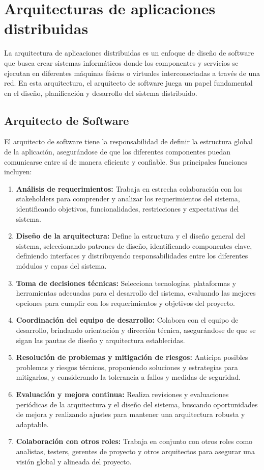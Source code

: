 \chapter{Arquitecturas de aplicaciones distribuidas}

La arquitectura de aplicaciones distribuidas es un enfoque de diseño de software que busca crear sistemas informáticos donde los componentes y servicios se ejecutan en diferentes máquinas físicas o virtuales interconectadas a través de una red. En esta arquitectura, el arquitecto de software juega un papel fundamental en el diseño, planificación y desarrollo del sistema distribuido.

\section{Arquitecto de Software}
El arquitecto de software tiene la responsabilidad de definir la estructura global de la aplicación, asegurándose de que los diferentes componentes puedan comunicarse entre sí de manera eficiente y confiable. Sus principales funciones incluyen:

\begin{enumerate}
	\item \textbf{Análisis de requerimientos:} Trabaja en estrecha colaboración con los stakeholders para comprender y analizar los requerimientos del sistema, identificando objetivos, funcionalidades, restricciones y expectativas del sistema.
	\item \textbf{Diseño de la arquitectura:} Define la estructura y el diseño general del sistema, seleccionando patrones de diseño, identificando componentes clave, definiendo interfaces y distribuyendo responsabilidades entre los diferentes módulos y capas del sistema.
	\item \textbf{Toma de decisiones técnicas:} Selecciona tecnologías, plataformas y herramientas adecuadas para el desarrollo del sistema, evaluando las mejores opciones para cumplir con los requerimientos y objetivos del proyecto.
	\item \textbf{Coordinación del equipo de desarrollo:} Colabora con el equipo de desarrollo, brindando orientación y dirección técnica, asegurándose de que se sigan las pautas de diseño y arquitectura establecidas.
	\item \textbf{Resolución de problemas y mitigación de riesgos:} Anticipa posibles problemas y riesgos técnicos, proponiendo soluciones y estrategias para mitigarlos, y considerando la tolerancia a fallos y medidas de seguridad.
	\item \textbf{Evaluación y mejora continua:} Realiza revisiones y evaluaciones periódicas de la arquitectura y el diseño del sistema, buscando oportunidades de mejora y realizando ajustes para mantener una arquitectura robusta y adaptable.
	\item \textbf{Colaboración con otros roles:} Trabaja en conjunto con otros roles como analistas, testers, gerentes de proyecto y otros arquitectos para asegurar una visión global y alineada del proyecto.
\end{enumerate}


